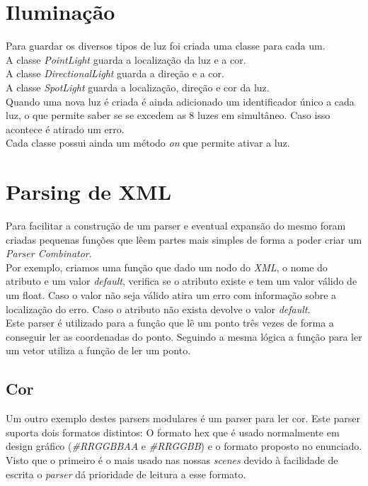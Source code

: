 \documentclass[a4paper]{report}
\begin{document}
\section{Iluminação}
Para guardar os diversos tipos de luz foi criada uma classe para cada um.\\
A classe \textit{PointLight} guarda a localização da luz e a cor.\\
A classe \textit{DirectionalLight} guarda a direção e a cor.\\
A classe \textit{SpotLight} guarda a localização, direção e cor da luz.\\
Quando uma nova luz é criada é ainda adicionado um identificador único a cada
luz, o que permite saber se se excedem as 8 luzes em simultâneo. Caso isso
acontece é atirado um erro.\\
Cada classe possui ainda um método \textit{on} que permite ativar a luz.

\section{Parsing de XML}
Para facilitar a construção de um parser e eventual expansão do mesmo foram
criadas pequenas funções que lêem partes mais simples de forma a poder criar um
\textit{Parser Combinator}.\\
Por exemplo, criamos uma função que dado um nodo do \textit{XML}, o nome do
atributo e um valor \textit{default}, verifica se o atributo existe e tem um
valor válido de um float. Caso o valor não seja válido atira um erro com
informação sobre a localização do erro. Caso o atributo não exista devolve o
valor \textit{default}.\\
Este parser é utilizado para a função que lê um ponto três vezes de forma a
conseguir ler as coordenadas do ponto. Seguindo a mesma lógica a função para ler
um vetor utiliza a função de ler um ponto.\\

\subsection{Cor}
Um outro exemplo destes parsers modulares é um parser para ler cor. Este parser
suporta dois formatos distintos: O formato hex que é usado normalmente em design
gráfico (\textit{\#RRGGBBAA} e \textit{\#RRGGBB}) e o formato proposto no
enunciado. Visto que o primeiro é o mais usado nas nossas \textit{scenes} devido
à facilidade de escrita o \textit{parser} dá prioridade de leitura a esse
formato.
\end{document}
